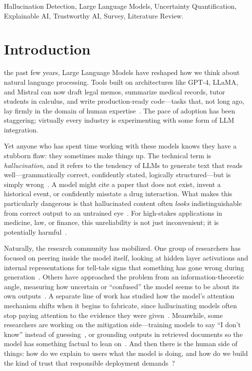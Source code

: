\documentclass[journal]{IEEEtran}
\begin{document}
\begin{IEEEkeywords}
Hallucination Detection, Large Language Models, Uncertainty Quantification, Explainable AI, Trustworthy AI, Survey, Literature Review.
\end{IEEEkeywords}

\IEEEpeerreviewmaketitle

\section{Introduction}

 the past few years, Large Language Models have reshaped how we think about natural language processing. Tools built on architectures like GPT-4, LLaMA, and Mistral can now draft legal memos, summarize medical records, tutor students in calculus, and write production-ready code---tasks that, not long ago, lay firmly in the domain of human expertise~\cite{trustllm, survey_alansari}. The pace of adoption has been staggering; virtually every industry is experimenting with some form of LLM integration.

Yet anyone who has spent time working with these models knows they have a stubborn flaw: they sometimes make things up. The technical term is \emph{hallucination}, and it refers to the tendency of LLMs to generate text that reads well---grammatically correct, confidently stated, logically structured---but is simply wrong~\cite{uq_survey, survey_alansari}. A model might cite a paper that does not exist, invent a historical event, or confidently misstate a drug interaction. What makes this particularly dangerous is that hallucinated content often \emph{looks} indistinguishable from correct output to an untrained eye~\cite{human_trust}. For high-stakes applications in medicine, law, or finance, this unreliability is not just inconvenient; it is potentially harmful~\cite{trustllm}.

Naturally, the research community has mobilized. One group of researchers has focused on peering inside the model itself, looking at hidden layer activations and internal representations for tell-tale signs that something has gone wrong during generation~\cite{mind, prism, mhad, hallushift}. Others have approached the problem from an information-theoretic angle, measuring how uncertain or ``confused'' the model seems to be about its own outputs~\cite{semantic_energy, epr, sep}. A separate line of work has studied how the model's attention mechanism shifts when it begins to fabricate, since hallucinating models often stop paying attention to the evidence they were given~\cite{map_misbelief, rauq}. Meanwhile, some researchers are working on the mitigation side---training models to say ``I don't know'' instead of guessing~\cite{calibrated_rl, entropy_spike}, or grounding outputs in retrieved documents so the model has something factual to lean on~\cite{expandr}. And then there is the human side of things: how do we explain to users what the model is doing, and how do we build the kind of trust that responsible deployment demands~\cite{xai_survey, human_trust}?
\end{document}

